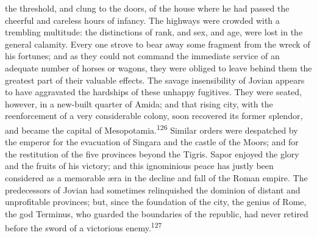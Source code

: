 the threshold, and clung to the doors, of the house where he had
passed the cheerful and careless hours of infancy. The highways
were crowded with a trembling multitude: the distinctions of
rank, and sex, and age, were lost in the general calamity. Every
one strove to bear away some fragment from the wreck of his
fortunes; and as they could not command the immediate service of
an adequate number of horses or wagons, they were obliged to
leave behind them the greatest part of their valuable effects.
The savage insensibility of Jovian appears to have aggravated the
hardships of these unhappy fugitives. They were seated, however,
in a new-built quarter of Amida; and that rising city, with the
reenforcement of a very considerable colony, soon recovered its
former splendor, and became the capital of Mesopotamia.\textsuperscript{126}
Similar orders were despatched by the emperor for the evacuation
of Singara and the castle of the Moors; and for the restitution
of the five provinces beyond the Tigris. Sapor enjoyed the glory
and the fruits of his victory; and this ignominious peace has
justly been considered as a memorable æra in the decline and fall
of the Roman empire. The predecessors of Jovian had sometimes
relinquished the dominion of distant and unprofitable provinces;
but, since the foundation of the city, the genius of Rome, the
god Terminus, who guarded the boundaries of the republic, had
never retired before the sword of a victorious enemy.\textsuperscript{127}





